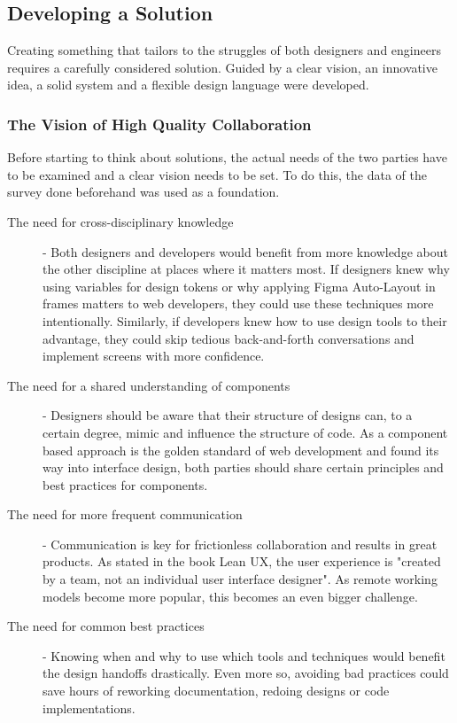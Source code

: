 \newpage
\subsection{Developing a Solution}
Creating something that tailors to the struggles of both designers and engineers requires a
carefully considered solution. Guided by a clear vision, an innovative idea, a solid system and a
flexible design language were developed.

\subsubsection{The Vision of High Quality Collaboration}
Before starting to think about solutions, the actual needs of the two parties have to be examined
and a clear vision needs to be set. To do this, the data of the survey done beforehand was used as a
foundation.

\begin{description}
      \item[The need for cross-disciplinary knowledge] - Both designers and developers would benefit
            from more knowledge about the other discipline at places where it matters most. If designers
            knew why using variables for design tokens or why applying Figma Auto-Layout in frames
            matters to web developers, they could use these techniques more intentionally. Similarly, if
            developers knew how to use design tools to their advantage, they could skip tedious
            back-and-forth conversations and implement screens with more confidence.
      \item[The need for a shared understanding of components] - Designers should be aware that their
            structure of designs can, to a certain degree, mimic and influence the structure of
            code. As a component based approach is the golden standard of web development and found
            its way into interface design, both parties should share certain principles and best
            practices for components.
      \item[The need for more frequent communication] - Communication is key for frictionless
            collaboration and results in great products. As stated in the book Lean UX, the user experience
            is "created by a team, not an individual user interface designer".
             As remote working models become more
            popular, this becomes an even bigger challenge.
      \item[The need for common best practices] - Knowing when and why to use which tools and
            techniques would benefit the design handoffs drastically. Even more so, avoiding bad practices
            could save hours of reworking documentation, redoing designs or code implementations.
\end{description}

